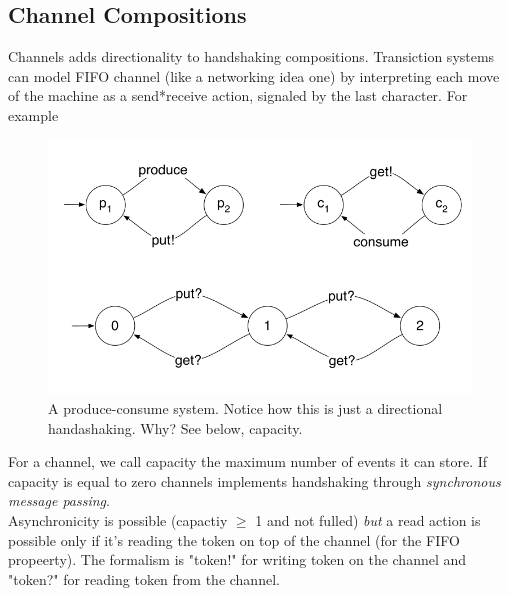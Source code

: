 \documentclass{article}
\begin{document}
			\subsection{Channel Compositions}
				Channels adds directionality to handshaking compositions. Transiction systems can model FIFO channel (like a networking idea one) by interpreting each move of the machine as a send*receive action, signaled by the last character. For example
				\begin{figure}[H]
					\centering
					\includegraphics[width = \textwidth]{./images/Channels.png}
					\caption{A produce-consume system. Notice how this is just a directional handashaking. Why? See below, capacity.}
				\end{figure}
				For a channel, we call capacity the maximum number of events it can store. If capacity is equal to zero channels implements handshaking through \emph{synchronous message passing}.\\
				Asynchronicity is possible (capactiy $\geq$ 1 and not fulled) \emph{but} a read action is possible only if it's reading the token on top of the channel (for the FIFO propeerty). The formalism is "token!" for writing token on the channel and "token?" for reading token from the channel.
				
\end{document}
